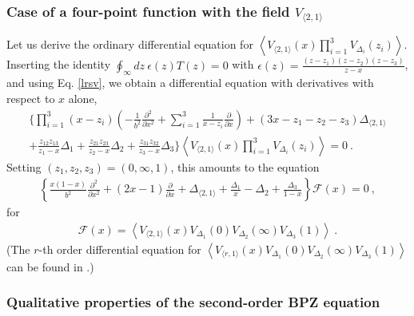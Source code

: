 \documentclass[12pt, a4paper, notitlepage, twoside]{report}
\numberwithin{equation}{section}
\theoremstyle{break}
\begin{document}
\subsubsection{Case of a four-point function with the field $V_{\langle 2,1 \rangle}$}

Let us derive the ordinary differential equation for $\left\langle V_{\langle 2,1 \rangle}(x)\prod_{i=1}^3 V_{\Delta_i}(z_i)\right\rangle$.
Inserting the identity $\oint_\infty dz\ \epsilon(z) T(z) =0$ with $\epsilon(z) = \frac{(z-z_1)(z-z_2)(z-z_3)}{z-x}$, and using Eq. \eqref{lrsv}, we obtain a differential equation with derivatives with respect to $x$ alone, 
\begin{multline}
  \Bigg\{ \prod_{i=1}^3(x-z_i)\left(-\frac{1}{b^2}\frac{\partial^2}{\partial x^2} +\sum_{i=1}^3 \frac{1}{x-z_i} {\frac{\partial}{\partial x}} \right) + (3x-z_1-z_2-z_3)\Delta_{\langle 2,1 \rangle} 
  \\
 +\frac{z_{12}z_{13}}{z_1-x}\Delta_1 + \frac{z_{21}z_{23}}{z_2-x}\Delta_2+\frac{z_{31}z_{32}}{z_3-x}\Delta_3\Bigg\} 
\left\langle V_{\langle 2,1 \rangle}(x)\prod_{i=1}^3 V_{\Delta_i}(z_i)\right\rangle  = 0\ .
\label{uode}
\end{multline}
Setting $(z_1,z_2,z_3)=(0,\infty,1)$, this amounts to the equation 
\begin{align}
  \left\{ \frac{x(1-x)}{b^2}\frac{\partial^2}{\partial x^2} + (2x-1){\frac{\partial}{\partial x}} +\Delta_{\langle 2,1 \rangle} +\frac{\Delta_1}{x}-\Delta_2 + \frac{\Delta_3}{1-x}\right\} \mathcal{F}(x)=0\ ,
\label{sode}
\end{align}
for 
\begin{align}
 \mathcal{F}(x) = \left\langle V_{\langle 2,1 \rangle}(x)V_{\Delta_1}(0)V_{\Delta_2}(\infty)V_{\Delta_3}(1)\right\rangle\ .
\label{fxv}
 \end{align}
(The $r$-th order differential equation for $\left\langle V_{\langle r,1 \rangle}(x)V_{\Delta_1}(0)V_{\Delta_2}(\infty)V_{\Delta_3}(1)\right\rangle $ can be found in \cite{flno09}.)

\subsubsection{Qualitative properties of the second-order BPZ equation}
\end{document}
